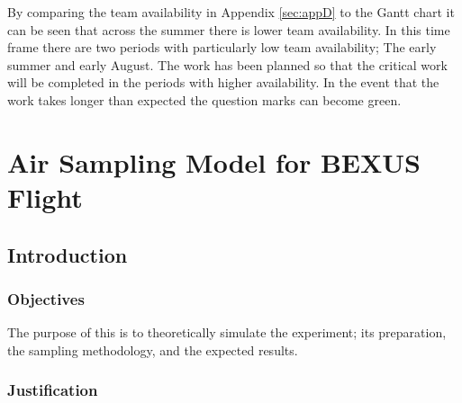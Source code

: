 \documentclass[a4paper,12pt,oneside]{article}
\begin{document}
\begin{appendices}
\begin{landscape}
By comparing the team availability in Appendix \ref{sec:appD} to the Gantt chart it can be seen that across the summer there is lower team availability. In this time frame there are two periods with particularly low team availability; The early summer and early August. The work has been planned so that the critical work will be completed in the periods with higher availability. In the event that the work takes longer than expected the question marks can become green.
\end{landscape}





\section{Air Sampling Model for BEXUS Flight}\label{sec:appH}


\subsection{Introduction}


\subsubsection{Objectives}

The purpose of this is to theoretically simulate the experiment; its preparation, the sampling methodology, and the expected results.

\subsubsection{Justification}


\end{appendices}
\end{document}
